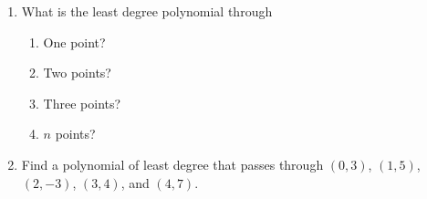 \documentclass[../gatm.tex]{subfiles}
\begin{document}
\begin{enumerate}
\begin{enumerate}
\item What is the least degree polynomial through%
\begin{multicols}{4}%
\begin{enumerate}%
\item One point?
\item Two points?
\item Three points?
\item $n$ points?
\end{enumerate}%
\end{multicols}%
\item Find a polynomial of least degree that passes through $(0,3)$, $(1,5)$, $(2,-3)$, $(3,4)$, and $(4,7)$.
\end{enumerate}
\setcounter{problem_i}{\value{enumi}}
\end{enumerate}
\end{document}
